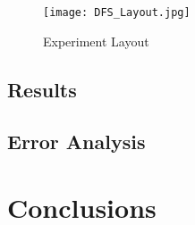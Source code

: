 \documentclass[12pt]{article}
\begin{document}
\begin{figure}%
	\centering
	\texttt{[image: DFS\_Layout.jpg]}
	\caption{Experiment Layout}%
	\label{fig:Layout}%
\end{figure}

\subsection*{Results}

\subsection*{Error Analysis}

\section*{Conclusions}





\end{document}
